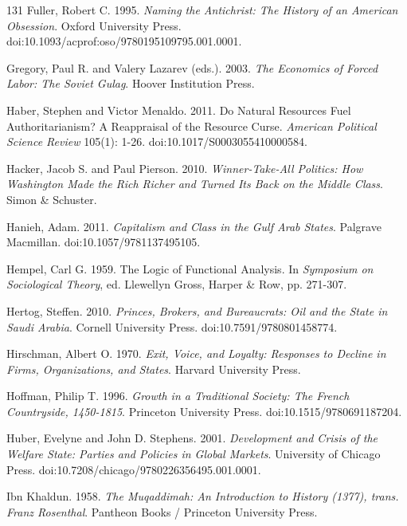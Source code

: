 \documentclass[11pt,letterpaper]{article}
\theoremstyle{definition}
\theoremstyle{remark}
\begin{document}
\begin{thebibliography}{131}
Fuller, Robert C. 1995. \emph{Naming the Antichrist: The History of an American Obsession}. Oxford University Press. doi:10.1093/acprof:oso/9780195109795.001.0001.

Gregory, Paul R. and Valery Lazarev (eds.). 2003. \emph{The Economics of Forced Labor: The Soviet Gulag}. Hoover Institution Press.

Haber, Stephen and Victor Menaldo. 2011. Do Natural Resources Fuel Authoritarianism? A Reappraisal of the Resource Curse. \emph{American Political Science Review} 105(1): 1-26. doi:10.1017/S0003055410000584.

Hacker, Jacob S. and Paul Pierson. 2010. \emph{Winner-Take-All Politics: How Washington Made the Rich Richer and Turned Its Back on the Middle Class}. Simon \& Schuster.

Hanieh, Adam. 2011. \emph{Capitalism and Class in the Gulf Arab States}. Palgrave Macmillan. doi:10.1057/9781137495105.

Hempel, Carl G. 1959. The Logic of Functional Analysis. In \emph{Symposium on Sociological Theory}, ed. Llewellyn Gross, Harper \& Row, pp. 271-307.

Hertog, Steffen. 2010. \emph{Princes, Brokers, and Bureaucrats: Oil and the State in Saudi Arabia}. Cornell University Press. doi:10.7591/9780801458774.

Hirschman, Albert O. 1970. \emph{Exit, Voice, and Loyalty: Responses to Decline in Firms, Organizations, and States}. Harvard University Press.

Hoffman, Philip T. 1996. \emph{Growth in a Traditional Society: The French Countryside, 1450-1815}. Princeton University Press. doi:10.1515/9780691187204.

Huber, Evelyne and John D. Stephens. 2001. \emph{Development and Crisis of the Welfare State: Parties and Policies in Global Markets}. University of Chicago Press. doi:10.7208/chicago/9780226356495.001.0001.

Ibn Khaldun. 1958. \emph{The Muqaddimah: An Introduction to History (1377), trans. Franz Rosenthal}. Pantheon Books / Princeton University Press.


\end{thebibliography}
\end{document}

